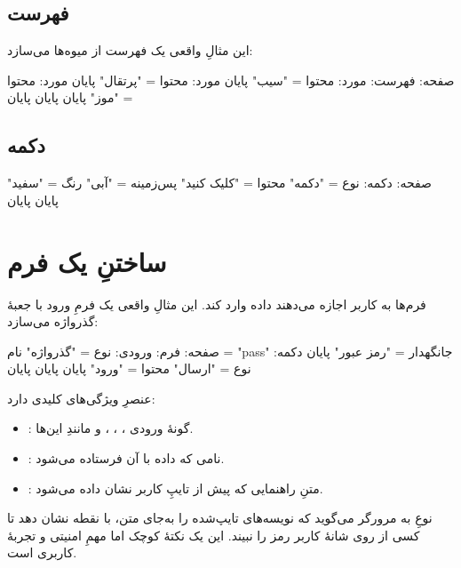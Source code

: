 \subsection{فهرست}

این مثالِ واقعی یک فهرست از میوه‌ها می‌سازد:

\begin{salamfa}
صفحه:
    فهرست:
        مورد: محتوا = "سیب" پایان
        مورد: محتوا = "پرتقال" پایان
        مورد: محتوا = "موز" پایان
    پایان
پایان
\end{salamfa}

\subsection{دکمه}

\begin{salamfa}
صفحه:
    دکمه: نوع = "دکمه" محتوا = "کلیک کنید" پس‌زمینه = "آبی" رنگ = "سفید" پایان
پایان
\end{salamfa}

\section{ساختنِ یک فرم}

فرم‌ها به کاربر اجازه می‌دهند داده وارد کند. این مثالِ واقعی یک فرمِ ورود با
جعبهٔ گذرواژه می‌سازد:

\begin{salamfa}
صفحه:
    فرم:
        ورودی: نوع = "گذرواژه" نام = "pass" جانگهدار = "رمز عبور" پایان
        دکمه: نوع = "ارسال" محتوا = "ورود" پایان
    پایان
پایان
\end{salamfa}

عنصرِ  ویژگی‌های کلیدی دارد:
\begin{itemize}
  \item {}: گونهٔ ورودی ، ،
        ،  و مانندِ این‌ها.
  \item {}: نامی که داده با آن فرستاده می‌شود.
  \item {}: متنِ راهنمایی که پیش از تایپِ کاربر نشان داده می‌شود.
\end{itemize}

\begin{tip}
نوعِ  به مرورگر می‌گوید که نویسه‌های تایپ‌شده را به‌جای متن، با
نقطه نشان دهد تا کسی از روی شانهٔ کاربر رمز را نبیند. این یک نکتهٔ کوچک اما
مهمِ امنیتی و تجربهٔ کاربری است.
\end{tip}

